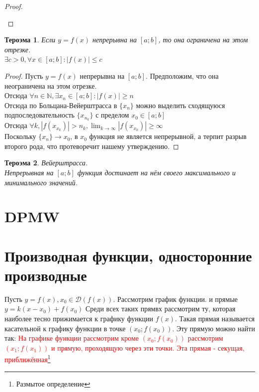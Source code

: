\documentclass[oneside]{book}
\newtheorem{thm}{Тероэма}[chapter] %
\begin{document}
\begin{enumerate}
\begin{proof}
\begin{center}
    \end{center}
\end{proof}
\begin{thm}
Если $y = f(x)$ непрерывна на $[a; b]$, то она ограничена на этом отрезке. \\
$ \exists c > 0, \forall x \in [a;b]: |f(x)| \leq c $
\end{thm}
\begin{proof}
    Пусть $y = f(x)$ непрерывна на $[a; b]$. Предположим, что она неограничена на этом отрезке. \\
    Отсюда $\forall n \in \mathbb{N}, \exists x_n \in [a;b]: |f(x)| \geq n$\\
    Отсюда по Больцана-Вейерштрасса в $\{x_n\}$ можно выделить сходящуюся подпоследовательность $\{x_{n_k}\}$ с пределом $x_0 \in [a; b]$\\
    Отсюда $\forall k, |f(x_{x_k})| > n_k, \lim_{k \rightarrow \infty}{|f(x_{x_k})|} \geq \infty$ \\
    Поскольку $\{x_n\} \rightarrow x_0$, в $x_0$ функция не является непрерывной, а терпит разрыв второго рода, что протеворечит нашему утверждению.
\end{proof}

\begin{thm}
    Вейерштрасса. \\
    Непрерывная на $[a; b]$ функция достинает на нём своего максимального и минимального значений.
\end{thm}

\chapter{DPMW}

\chapter{Производная функции, односторонние производные}

Пусть $y = f(x), x_0 \in \mathcal{D}(f(x))$. Рассмотрим график функции. и  прямые $y = k(x - x_0) + f(x_0)$
Среди всех таких прямвх рассмотрим ту, которая наиболее тесно прижимается к графику функции $f(x)$.
Такая прямая называется касательной к графику функции в точке $(x_0; f(x_0))$. Эту прямую можно найти так:
\textcolor{red}{На графике функции рассмотрим кроме $(x_0; f(x_0))$ рассмотрим $(x_1; f(x_1))$ и прямую, проходящую через эти точки. Эта прямая - секущая, приближённая\footnote{Размытое определение}}


\end{enumerate}
\end{document}
